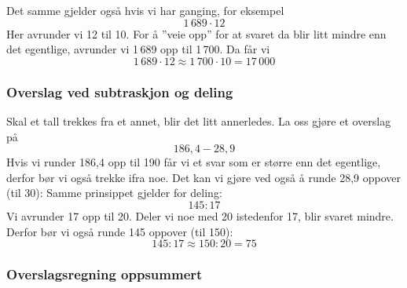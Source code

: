 \linje
Det samme gjelder også hvis vi har ganging, for eksempel
\[ 1\,689\cdot12 \]
Her avrunder vi 12 til 10. For å ''veie opp'' for at svaret da blir litt mindre enn det egentlige, avrunder vi 1\,689 opp til 1\,700. Da får vi
\[ 1\,689\cdot12\approx 1\,700\cdot 10 =17\,000 \]
\subsubsection{Overslag ved subtraskjon og deling}
Skal et tall trekkes fra et annet, blir det litt annerledes. La oss gjøre et overslag på
\[ 186,4-28,9 \]
Hvis vi runder 186,4 opp til 190 får vi et svar som er større enn det egentlige, derfor bør vi også trekke ifra noe. Det kan vi gjøre ved også å runde 28,9 oppover (til 30):
Samme prinsippet gjelder for deling: 
\[ 145:17 \]
Vi avrunder 17 opp til 20. Deler vi noe med 20 istedenfor 17, blir svaret mindre. Derfor bør vi også runde 145 oppover (til 150):
\[ 145:17 \approx 150:20 = 75 \]

\subsubsection{Overslagsregning oppsummert}
 \vsk

